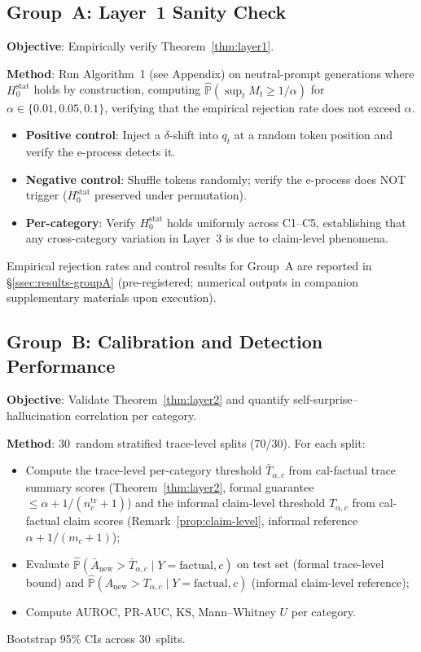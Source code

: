\documentclass[runningheads]{llncs}
\newcommand{\Hnull}{H_0^{\text{stat}}}
\begin{document}
\subsection{Group~A: Layer~1 Sanity Check}

\textbf{Objective}: Empirically verify Theorem~\ref{thm:layer1}.

\textbf{Method}: Run Algorithm~1 (see Appendix) on neutral-prompt generations
where $\Hnull$ holds by construction, computing
$\hat{\mathbb{P}}(\sup_t M_t \ge 1/\alpha)$ for
$\alpha \in \{0.01, 0.05, 0.1\}$, verifying that the empirical rejection rate
does not exceed $\alpha$.
\begin{itemize}
    \item \textbf{Positive control}: Inject a $\delta$-shift into $q_t$
          at a random token position and verify the e-process detects it.
    \item \textbf{Negative control}: Shuffle tokens randomly; verify the
          e-process does NOT trigger ($\Hnull$ preserved under permutation).
    \item \textbf{Per-category}: Verify $\Hnull$ holds uniformly across
          C1--C5, establishing that any cross-category variation in Layer~3
          is due to claim-level phenomena.
\end{itemize}

Empirical rejection rates and control results for Group~A are reported in
\S\ref{ssec:results-groupA} (pre-registered; numerical outputs in
companion supplementary materials upon execution).

\subsection{Group~B: Calibration and Detection Performance}

\textbf{Objective}: Validate Theorem~\ref{thm:layer2} and quantify
self-surprise--hallucination correlation per category.

\textbf{Method}: 30~random stratified trace-level splits (70/30). For each
split:
\begin{itemize}
    \item Compute the trace-level per-category threshold
          $\bar{T}_{\alpha, c}$ from cal-factual trace summary scores
          (Theorem~\ref{thm:layer2}, formal guarantee
          $\le \alpha + 1/(n_c^{\text{tr}}+1)$) and the informal
          claim-level threshold $T_{\alpha, c}$ from cal-factual claim
          scores (Remark~\ref{prop:claim-level}, informal reference
          $\alpha + 1/(m_c+1)$);
    \item Evaluate $\hat{\mathbb{P}}(\bar{A}_{\text{new}} >
          \bar{T}_{\alpha, c} \mid Y = \text{factual}, c)$ on test set
          (formal trace-level bound) and
          $\hat{\mathbb{P}}(A_{\text{new}} > T_{\alpha, c} \mid
          Y = \text{factual}, c)$ (informal claim-level reference);
    \item Compute AUROC, PR-AUC, KS, Mann--Whitney $U$ per category.
\end{itemize}
Bootstrap 95\% CIs across 30~splits.
\end{document}
